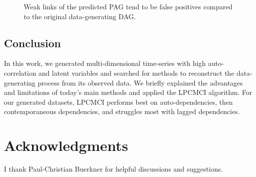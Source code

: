 \documentclass[conference]{IEEEtran}
\begin{document}
\begin{figure}[htbp]
    \centering
    \caption{Weak links of the predicted PAG tend to be false positives compared to the original data-generating DAG.}
        \label{fig:removed}
\end{figure}


\subsection{Conclusion}
In this work, we generated multi-dimensional time-series with high auto-correlation and latent variables and searched for methods to reconstruct the data-generating process from its observed data.
We briefly explained the advantages and limitations of today's main methods and applied the LPCMCI algorithm.
For our generated datasets, LPCMCI performs best on auto-dependencies, then contemporaneous dependencies, and struggles most with lagged dependencies.

\section{Acknowledgments}
I thank Paul-Christian Buerkner for helpful discussions and suggestions.







\end{document}
